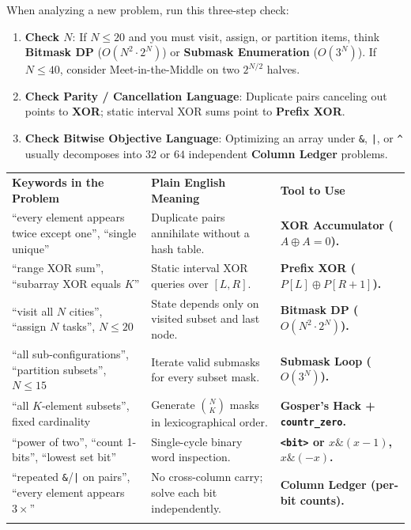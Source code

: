 \documentclass[11pt,a4paper]{article}
\theoremstyle{definition}
\begin{document}
When analyzing a new problem, run this three-step check:
\begin{enumerate}
    \item \textbf{Check $N$}: If $N \le 20$ and you must visit, assign, or partition items, think \textbf{Bitmask DP} ($O(N^2 \cdot 2^N)$) or \textbf{Submask Enumeration} ($O(3^N)$). If $N \le 40$, consider Meet-in-the-Middle on two $2^{N/2}$ halves.
    \item \textbf{Check Parity / Cancellation Language}: Duplicate pairs canceling out points to \textbf{XOR}; static interval XOR sums point to \textbf{Prefix XOR}.
    \item \textbf{Check Bitwise Objective Language}: Optimizing an array under \texttt{\&}, \texttt{|}, or \texttt{\textasciicircum} usually decomposes into $32$ or $64$ independent \textbf{Column Ledger} problems.
\end{enumerate}

\begingroup\small{}
\begin{tabularx}{\textwidth}{>{\raggedright\arraybackslash}p{4.3cm} >{\raggedright\arraybackslash}X >{\raggedright\arraybackslash\bfseries}p{4.0cm}}
\arrayrulecolor{primaryblue}\toprule[1.2pt]
\rowcolor{primaryblue!10}
\textcolor{primaryblue}{\textbf{Keywords in the Problem}} & \textcolor{primaryblue}{\textbf{Plain English Meaning}} & \textcolor{primaryblue}{\textbf{Tool to Use}} \\
\arrayrulecolor{codeframe}\midrule[0.6pt]
``every element appears twice except one'', ``single unique'' & Duplicate pairs annihilate without a hash table. & XOR Accumulator ($A \oplus A = 0$). \\
``range XOR sum'', ``subarray XOR equals $K$'' & Static interval XOR queries over $[L, R]$. & Prefix XOR ($P[L] \oplus P[R+1]$). \\
``visit all $N$ cities'', ``assign $N$ tasks'', $N \le 20$ & State depends only on visited subset and last node. & Bitmask DP ($O(N^2 \cdot 2^N)$). \\
``all sub-configurations'', ``partition subsets'', $N \le 15$ & Iterate valid submasks for every subset mask. & Submask Loop ($O(3^N)$). \\
``all $K$-element subsets'', fixed cardinality & Generate $\binom{N}{K}$ masks in lexicographical order. & Gosper's Hack + \texttt{countr\_zero}. \\
``power of two'', ``count 1-bits'', ``lowest set bit'' & Single-cycle binary word inspection. & \texttt{<bit>} or $x \mathbin{\&} (x{-}1)$, $x \mathbin{\&} (-x)$. \\
``repeated \texttt{\&}/\texttt{|} on pairs'', ``every element appears $3\times$'' & No cross-column carry; solve each bit independently. & Column Ledger (per-bit counts). \\
\arrayrulecolor{primaryblue}\bottomrule[1.2pt]
\end{tabularx}\endgroup
\end{document}
